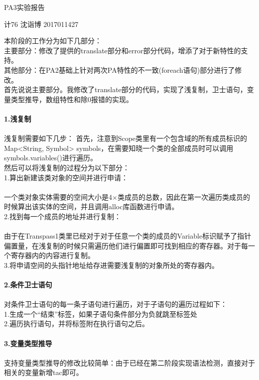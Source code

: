 \documentclass[UTF8]{ctexart}
\begin{document}
\begin{center}
\begin{LARGE}
PA3实验报告\\
\end{LARGE}
计76 沈诣博 2017011427
\end{center}
本阶段的工作分为如下几部分：\\
主要部分：修改了提供的translate部分和error部分代码，增添了对于新特性的支持。\\
其他部分：在PA2基础上针对两次PA特性的不一致(foreach语句)部分进行了修改。\\
首先说说主要部分。我修改了translate部分的代码，实现了浅复制，卫士语句，变量类型推导，数组特性和除0报错的实现。\\\\
\textbf{1.浅复制}\\\\
浅复制需要如下几步：
首先，注意到Scope类里有一个包含域的所有成员标识的Map<String, Symbol> symbols，在需要知晓一个类的全部成员时可以调用symbols.variables()进行遍历。\\
然后可以将浅复制的过程分为以下部分：\\
1.算出新建该类对象的空间并进行申请：\\\\
一个类对象实体需要的空间大小是4$\times$类成员的总数，因此在第一次遍历类成员的时候算出该实体的空间，并且调用alloc库函数进行申请。\\
2.找到每一个成员的地址并进行复制：\\\\
由于在Transpass1类里已经对于对于任意一个类的成员的Variable标识赋予了指针偏置量，在浅复制的时候只需遍历他们进行偏置即可找到相应的寄存器。对于每一个寄存器内的内容进行复制。\\
3.将申请空间的头指针地址给存进需要浅复制的对象所处的寄存器内。\\\\
\textbf{2.条件卫士语句}\\\\
对条件卫士语句的每一条子语句进行遍历，对于子语句的遍历过程如下：\\
1.生成一个“结束”标签，如果子语句条件部分为负就跳至标签处\\
2.遍历执行语句，并将标签附在执行语句之后。\\\\
\textbf{3.变量类型推导}\\\\
支持变量类型推导的修改比较简单：由于已经在第二阶段实现语法检测，直接对于相关的变量新增tac即可。\\\\
\end{document}
